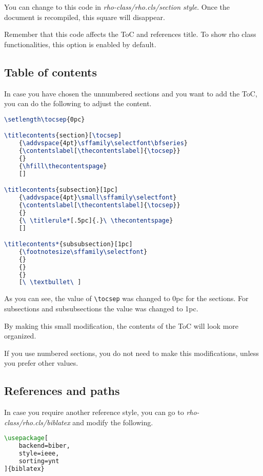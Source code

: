 \documentclass[9pt,a4paper,twoside]{rho-class/rho}
\begin{document}
        You can change to this code in \textit{rho-class/rho.cls/section style}. Once the document is recompiled, this square will disappear. 

        Remember that this code affects the ToC and references title. To show rho class functionalities, this option is enabled by default.

    \subsection{Table of contents}
    
        In case you have chosen the unnumbered sections and you want to add the ToC, you can do the following to adjust the content.

\nolinenumbers
\begin{lstlisting}[language=TeX, caption=ToC when unnumbered section is chosen.]
\setlength\tocsep{0pc}

\titlecontents{section}[\tocsep]
    {\addvspace{4pt}\sffamily\selectfont\bfseries}
    {\contentslabel[\thecontentslabel]{\tocsep}}
    {}
    {\hfill\thecontentspage}
    []

\titlecontents{subsection}[1pc]
    {\addvspace{4pt}\small\sffamily\selectfont}
    {\contentslabel[\thecontentslabel]{\tocsep}}
    {}
    {\ \titlerule*[.5pc]{.}\ \thecontentspage}
    []

\titlecontents*{subsubsection}[1pc]
    {\footnotesize\sffamily\selectfont}
    {}
    {}
    {}
    [\ \textbullet\ ]
\end{lstlisting}
\linenumbers

        As you can see, the value of \verb|\tocsep| was changed to 0pc for the sections. For subsections and subsubsections the value was changed to 1pc.

        By making this small modification, the contents of the ToC will look more organized.

        If you use numbered sections, you do not need to make this modifications, unless you prefer other values.

    \subsection{References and paths}

        In case you require another reference style, you can go to \textit{rho-class/rho.cls/biblatex} and modify the following. 

\nolinenumbers
\begin{lstlisting}[language=TeX, caption=Reference code.]
\usepackage[
    backend=biber,
    style=ieee,
    sorting=ynt
]{biblatex}
\end{lstlisting}
\linenumbers
\end{document}
